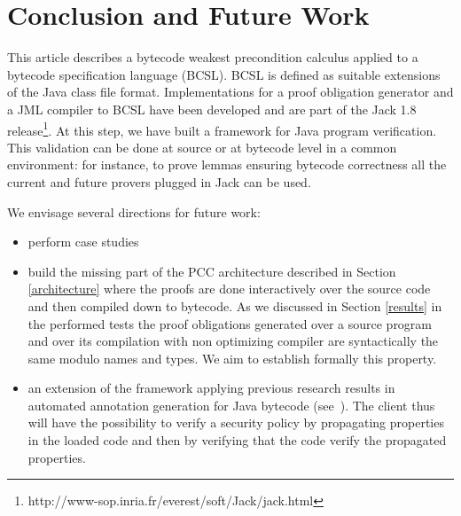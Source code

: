 \section{Conclusion and Future Work}\label{conclusion}
This article describes a bytecode weakest precondition calculus applied to a bytecode specification language (BCSL).
BCSL is defined as suitable extensions of the Java class file format.
Implementations for a proof obligation generator and a JML compiler to BCSL have been developed and are part of the Jack 1.8 release\footnote{http://www-sop.inria.fr/everest/soft/Jack/jack.html}.
At this step, we have built a framework for Java program verification. This validation can be done at source or at bytecode level in a common environment: for instance, to prove lemmas ensuring bytecode correctness all the current and future provers plugged in Jack can be used.


 We envisage several directions for future work:
\begin{itemize}
  \item perform case studies
  \item build the missing part of the PCC architecture described in Section \ref{architecture} where the proofs are done interactively over the source code
and then compiled down to bytecode. As we discussed in Section \ref{results} in the performed tests the 
proof obligations generated over a source program and over its compilation with non optimizing compiler are
 syntactically the same modulo names and types. We aim to establish formally this property.  
  \item an extension of the framework applying previous research results in automated annotation generation for
 Java bytecode (see~\cite{PBBHL}). The client thus will have the possibility to verify a security policy by
 propagating properties in the loaded code and then by verifying that the code verify the propagated properties.

\end{itemize}



